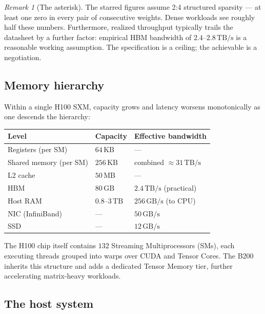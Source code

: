 \documentclass[11pt,a4paper]{article}
\theoremstyle{definition}
\theoremstyle{remark}
\newtheorem{remark}[definition]{Remark}
\theoremstyle{plain}
\newcommand{\GB}{\,\text{GB}}
\newcommand{\TB}{\,\text{TB}}
\begin{document}
\begin{remark}[The asterisk]
The starred figures assume 2{:}4 structured sparsity --- at least one zero in every pair of consecutive weights. Dense workloads see roughly half these numbers. Furthermore, realized throughput typically trails the datasheet by a further factor: empirical HBM bandwidth of $2.4$--$2.8\TB/\text{s}$ is a reasonable working assumption. The specification is a ceiling; the achievable is a negotiation.
\end{remark}

\subsection{Memory hierarchy}

Within a single H100 SXM, capacity grows and latency worsens monotonically as one descends the hierarchy:

\begin{center}
\begin{tabular}{lll}
\toprule
Level & Capacity & Effective bandwidth \\
\midrule
Registers (per SM)          & $64\,\text{KB}$   & --- \\
Shared memory (per SM)      & $256\,\text{KB}$  & combined $\approx 31\TB/\text{s}$ \\
L2 cache                    & $50\,\text{MB}$   & --- \\
HBM                         & $80\GB$    & $2.4\TB/\text{s}$ (practical) \\
Host RAM                    & $0.8$--$3\TB$ & $256\GB/\text{s}$ (to CPU) \\
NIC (InfiniBand)            & ---        & $50\GB/\text{s}$ \\
SSD                         & ---        & $12\GB/\text{s}$ \\
\bottomrule
\end{tabular}
\end{center}

The H100 chip itself contains $132$ Streaming Multiprocessors (SMs), each executing threads grouped into warps over CUDA and Tensor Cores. The B200 inherits this structure and adds a dedicated Tensor Memory tier, further accelerating matrix-heavy workloads.

\subsection{The host system}
\end{document}
